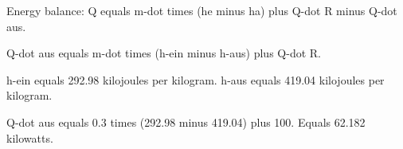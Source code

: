 Energy balance:  
Q equals m-dot times (he minus ha) plus Q-dot R minus Q-dot aus.  

Q-dot aus equals m-dot times (h-ein minus h-aus) plus Q-dot R.  

h-ein equals 292.98 kilojoules per kilogram.  
h-aus equals 419.04 kilojoules per kilogram.  

Q-dot aus equals 0.3 times (292.98 minus 419.04) plus 100.  
Equals 62.182 kilowatts.